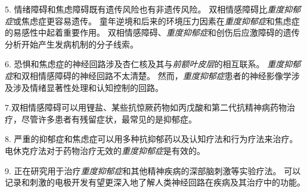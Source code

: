 5. 情绪障碍和焦虑障碍既有遗传风险也有非遗传风险。
双相情感障碍比\textit{重度抑郁症}或焦虑症更容易遗传。
童年逆境和后来的环境压力因素在\textit{重度抑郁症}和焦虑症的易感性中起着重要作用。
双相情感障碍、\textit{重度抑郁症}和创伤后应激障碍的遗传分析开始产生发病机制的分子线索。


6. 恐惧和焦虑症的神经回路涉及杏仁核及其与\textit{前额叶皮层}的相互联系。
\textit{重度抑郁症}和双相情感障碍的神经回路不太清楚。
然而，\textit{重度抑郁症}患者的神经影像学涉及涉及情绪显著性处理和认知控制的回路。


7.双相情感障碍可以用锂盐、某些抗惊厥药物如丙戊酸和第二代抗精神病药物治疗，尽管许多患者有残留症状，最常见的是抑郁症。


8. 严重的抑郁症和焦虑症可以用多种抗抑郁药以及认知疗法和行为疗法来治疗。
电休克疗法对于药物治疗无效的\textit{重度抑郁症}是有效的。


9. 正在研究用于治疗\textit{重度抑郁症}和其他精神疾病的深部脑刺激等实验疗法。
可以记录和刺激的电极开发有望更深入地了解人类神经回路在疾病及其治疗中的功能。




